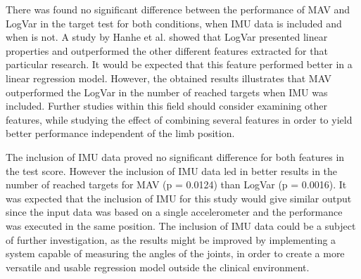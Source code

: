 	
	There was found no significant difference between the performance of MAV and LogVar in the target test for both conditions, when IMU data is included and when is not. A study by Hanhe \cite{hanhe2014} et al. showed that LogVar presented linear properties and outperformed the other different features extracted for that particular research. It would be expected that this feature performed better in a linear regression model. However, the obtained results illustrates that MAV outperformed the LogVar in the number of reached targets when IMU was included. 
	Further studies within this field should consider examining other features, while studying the effect of combining several features in order to yield better performance independent of the limb position.
	
	
	The inclusion of IMU data proved no significant difference for both features in the test score. However the inclusion of IMU data led in better results in the number of reached targets for MAV (p = 0.0124) than LogVar (p = 0.0016). It was expected that the inclusion of IMU for this study would give similar output since the input data was based on a single accelerometer and the performance was executed in the same position. The inclusion of IMU data could be a subject of further investigation, as the results might be improved by implementing a system capable of measuring the angles of the joints, in order to create a more versatile and usable regression model outside the clinical environment.
	
